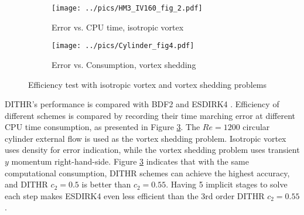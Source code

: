 \documentclass[10pt]{article}
\begin{document}
\begin{figure}[htbp]
  \centering
  \begin{subfigure}{0.4\textwidth}
    \texttt{[image: ../pics/HM3\_IV160\_fig\_2.pdf]}
    \caption[]{Error vs. CPU time, isotropic vortex}
    \label{sfig:IVTests_Eff}
  \end{subfigure}\hfill
  \begin{subfigure}{0.4\textwidth}
    \texttt{[image: ../pics/Cylinder\_fig4.pdf]}
    \caption[]{Error vs. Consumption, vortex shedding}
    \label{sfig:CyTests_Eff}
  \end{subfigure}
  \caption[]{Efficiency test with isotropic vortex and vortex shedding problems}
  \label{fig:IVTests}
\end{figure}

DITHR's performance is compared with BDF2 and ESDIRK4 \cite{kennedy2003additiveARK}.
Efficiency of different schemes is compared by 
recording their time marching error at different CPU time consumption,
as presented in Figure \ref{fig:IVTests}. 
The $Re=1200$ 
circular cylinder external flow is used as the vortex shedding problem.
Isotropic vortex uses density for error indication, while the 
vortex shedding problem uses transient $y$ momentum right-hand-side.
Figure \ref{fig:IVTests} indicates that with the same computational 
consumption, DITHR schemes can achieve the highest accuracy, 
and DITHR $c_2=0.5$ is better than $c_2=0.55$.
Having 5 implicit stages to solve each step makes ESDIRK4 even less efficient than 
the 3rd order DITHR $c_2=0.55$.
\end{document}
